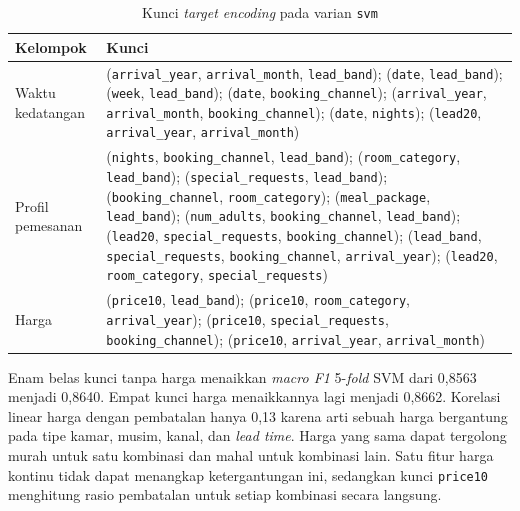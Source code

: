 \begin{table}[H]
	\centering
	\caption{Kunci \textit{target encoding} pada varian \texttt{svm}}
	\label{tab:te-kunci}
	\small
	\begin{tabular}{l p{10.5cm}}
		\toprule
		\textbf{Kelompok} & \textbf{Kunci} \\
		\midrule
		Waktu kedatangan & (\texttt{arrival\_year}, \texttt{arrival\_month}, \texttt{lead\_band}); (\texttt{date}, \texttt{lead\_band}); (\texttt{week}, \texttt{lead\_band}); (\texttt{date}, \texttt{booking\_channel}); (\texttt{arrival\_year}, \texttt{arrival\_month}, \texttt{booking\_channel}); (\texttt{date}, \texttt{nights}); (\texttt{lead20}, \texttt{arrival\_year}, \texttt{arrival\_month}) \\
		Profil pemesanan & (\texttt{nights}, \texttt{booking\_channel}, \texttt{lead\_band}); (\texttt{room\_category}, \texttt{lead\_band}); (\texttt{special\_requests}, \texttt{lead\_band}); (\texttt{booking\_channel}, \texttt{room\_category}); (\texttt{meal\_package}, \texttt{lead\_band}); (\texttt{num\_adults}, \texttt{booking\_channel}, \texttt{lead\_band}); (\texttt{lead20}, \texttt{special\_requests}, \texttt{booking\_channel}); (\texttt{lead\_band}, \texttt{special\_requests}, \texttt{booking\_channel}, \texttt{arrival\_year}); (\texttt{lead20}, \texttt{room\_category}, \texttt{special\_requests}) \\
		Harga & (\texttt{price10}, \texttt{lead\_band}); (\texttt{price10}, \texttt{room\_category}, \texttt{arrival\_year}); (\texttt{price10}, \texttt{special\_requests}, \texttt{booking\_channel}); (\texttt{price10}, \texttt{arrival\_year}, \texttt{arrival\_month}) \\
		\bottomrule
	\end{tabular}
\end{table}

Enam belas kunci tanpa harga menaikkan \textit{macro F1} 5-\textit{fold} SVM dari
0,8563 menjadi 0,8640. Empat kunci harga menaikkannya lagi menjadi 0,8662.
Korelasi linear harga dengan pembatalan hanya 0,13 karena arti sebuah harga
bergantung pada tipe kamar, musim, kanal, dan \textit{lead time}. Harga yang sama
dapat tergolong murah untuk satu kombinasi dan mahal untuk kombinasi lain. Satu
fitur harga kontinu tidak dapat menangkap ketergantungan ini, sedangkan kunci
\texttt{price10} menghitung rasio pembatalan untuk setiap kombinasi secara
langsung.




